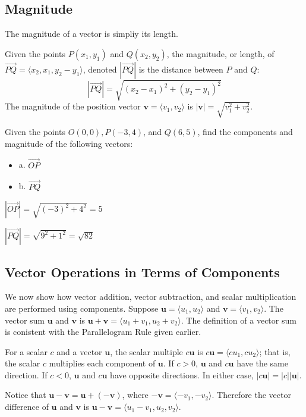\documentclass[../calc3.tex]{subfiles}
\begin{document}
\subsection*{Magnitude}
The magnitude of a vector is simpliy its length.

\begin{definition}
    Given the points $P(x_1,y_1)$ and $Q(x_2,y_2)$, the magnitude, or length, of $\vec{PQ}=\langle x_2,x_1,y_2-y_1\rangle$, denoted $|\vec{PQ}|$ is the distance between $P$ and $Q$:
    \[ |\vec{PQ}| = \sqrt{(x_2-x_1)^2+(y_2-y_1)^2} \]
    The magnitude of the position vector $\textbf{v}=\langle v_1,v_2\rangle$ is $|\textbf{v}|=\sqrt{v_1^2+v_2^2}$.
\end{definition}

\begin{example}
    Given the points $O(0,0), P(-3,4)$, and $Q(6,5)$, find the components and magnitude of the following vectors:
    \begin{itemize}
        \item a. $\vec{OP}$
        \item b. $\vec{PQ}$
    \end{itemize}

    $|\vec{OP}|=\sqrt{(-3)^2+4^2}=5$

    $|\vec{PQ}|=\sqrt{9^2+1^2}=\sqrt{82}$
\end{example}

\subsection*{Vector Operations in Terms of Components}
We now show how vector addition, vector subtraction, and scalar multiplication are performed using components. 
Suppose $\textbf{u}=\langle u_1,u_2\rangle$ and $\textbf{v}=\langle v_1,v_2\rangle$. The vector sum $\textbf{u}$ and $\textbf{v}$ is 
$\textbf{u}+\textbf{v}=\langle u_1+v_1,u_2+v_2\rangle$. The definition of a vector sum is conistent with the Parallelogram Rule given earlier.

For a scalar $c$ and a vector $\textbf{u}$, the scalar multiple $c\textbf{u}$ is $c\textbf{u}=\langle cu_1,cu_2\rangle$; that is, the scalar $c$ multiplies each component of $\textbf{u}$. If $c>0$, $\textbf{u}$ and $c\textbf{u}$ have the same direction.
If $c<0$, $\textbf{u}$ and $c\textbf{u}$ have opposite directions. In either case, $|c\textbf{u}|=|c||\textbf{u}|$.

Notice that $\textbf{u}-\textbf{v}=\textbf{u}+(-\textbf{v})$, where $-\textbf{v}=\langle -v_1,-v_2\rangle$. Therefore the vector difference of 
$\textbf{u}$ and $\textbf{v}$ is $\textbf{u}-\textbf{v}=\langle u_1-v_1,u_2,v_2\rangle$.
\end{document}
